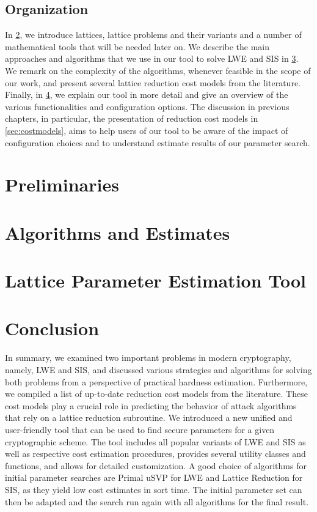 \documentclass[
  a4paper,  %
  twoside,  %
  bibliography=totoc,
  headsepline,
  cleardoublepage=empty,
  parskip=half,
  draft=false
]{scrbook}
\begin{document}
\section{Organization}
In \cref{ch:preliminaries}, we introduce lattices, lattice problems and their variants and a number of mathematical tools that will be needed later on. We describe the main approaches and algorithms that we use in our tool to solve LWE and SIS in \cref{ch:algorithms}. We remark on the complexity of the algorithms, whenever feasible in the scope of our work, and present several lattice reduction cost models from the literature. Finally, in \cref{ch:tool}, we explain our tool in more detail and give an overview of the various functionalities and configuration options. The discussion in previous chapters, in particular, the presentation of reduction cost models in \cref{sec:costmodels}, aims to help users of our tool to be aware of the impact of configuration choices and to understand estimate results of our parameter search. %

\chapter{Preliminaries} \label{ch:preliminaries}



\chapter{Algorithms and Estimates}\label{ch:algorithms}




\chapter{Lattice Parameter Estimation Tool}\label{ch:tool}



\chapter{Conclusion}
In summary, we examined two important problems in modern cryptography, namely, LWE and SIS, and discussed various strategies and algorithms for solving both problems from a perspective of practical hardness estimation. Furthermore, we compiled a list of up-to-date reduction cost models from the literature. These cost models play a crucial role in predicting the behavior of attack algorithms that rely on a lattice reduction subroutine. We introduced a new unified and user-friendly tool that can be used to find secure parameters for a given cryptographic scheme. The tool includes all popular variants of LWE and SIS as well as respective cost estimation procedures, provides several utility classes and functions, and allows for detailed customization. A good choice of algorithms for initial parameter searches are Primal uSVP for LWE and Lattice Reduction for SIS, as they yield low cost estimates in sort time. The initial parameter set can then be adapted and the search run again with all algorithms for the final result.
\end{document}
